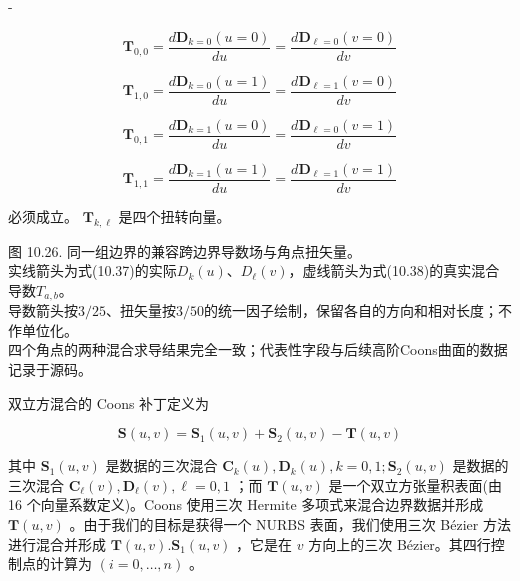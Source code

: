 \documentclass[../main.tex]{subfiles}
\begin{document}
-

\[
{\mathbf{T}}_{0,0} = \frac{d{\mathbf{D}}_{k = 0}\left( {u = 0}\right) }{du} = \frac{d{\mathbf{D}}_{\ell  = 0}\left( {v = 0}\right) }{dv}
\]



\[
{\mathbf{T}}_{1,0} = \frac{d{\mathbf{D}}_{k = 0}\left( {u = 1}\right) }{du} = \frac{d{\mathbf{D}}_{\ell  = 1}\left( {v = 0}\right) }{dv}
\]

\[
{\mathbf{T}}_{0,1} = \frac{d{\mathbf{D}}_{k = 1}\left( {u = 0}\right) }{du} = \frac{d{\mathbf{D}}_{\ell  = 0}\left( {v = 1}\right) }{dv}
\]

\[
{\mathbf{T}}_{1,1} = \frac{d{\mathbf{D}}_{k = 1}\left( {u = 1}\right) }{du} = \frac{d{\mathbf{D}}_{\ell  = 1}\left( {v = 1}\right) }{dv} \tag{10.38}
\]

必须成立。 \({\mathbf{T}}_{k,\ell }\) 是四个扭转向量。

\begin{center}
\begin{minipage}{27cm}
\centering
{}
\par\smallskip
图 10.26. 同一组边界的兼容跨边界导数场与角点扭矢量。\\
实线箭头为式(10.37)的实际$D_k(u)$、$D_\ell(v)$，虚线箭头为式(10.38)的真实混合导数$T_{a,b}$。\\
导数箭头按$3/25$、扭矢量按$3/50$的统一因子绘制，保留各自的方向和相对长度；不作单位化。\\
四个角点的两种混合求导结果完全一致；代表性字段与后续高阶Coons曲面的数据记录于源码。
\end{minipage}
\end{center}



双立方混合的 Coons 补丁定义为

\[
\mathbf{S}\left( {u,v}\right)  = {\mathbf{S}}_{1}\left( {u,v}\right)  + {\mathbf{S}}_{2}\left( {u,v}\right)  - \mathbf{T}\left( {u,v}\right)  \tag{10.39}
\]

其中 \({\mathbf{S}}_{1}\left( {u,v}\right)\) 是数据的三次混合 \({\mathbf{C}}_{k}\left( u\right) ,{\mathbf{D}}_{k}\left( u\right) ,k = 0,1;{\mathbf{S}}_{2}\left( {u,v}\right)\) 是数据的三次混合 \({\mathbf{C}}_{\ell }\left( v\right) ,{\mathbf{D}}_{\ell }\left( v\right) ,\ell  = 0,1\) ；而 \(\mathbf{T}\left( {u,v}\right)\) 是一个双立方张量积表面(由 16 个向量系数定义)。Coons 使用三次 Hermite 多项式来混合边界数据并形成 \(\mathbf{T}\left( {u,v}\right)\) 。由于我们的目标是获得一个 NURBS 表面，我们使用三次 Bézier 方法进行混合并形成 \(\mathbf{T}\left( {u,v}\right) .{\mathbf{S}}_{1}\left( {u,v}\right)\) ，它是在 \(v\) 方向上的三次 Bézier。其四行控制点的计算为 \(\left( {i = 0,\ldots ,n}\right)\) 。
\end{document}
